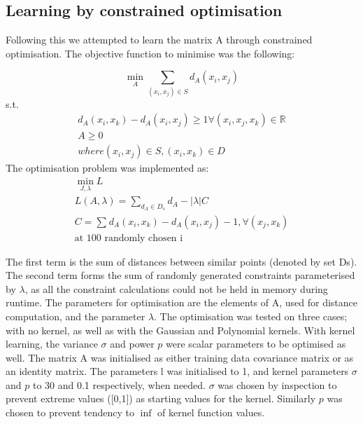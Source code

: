 \documentclass[10pt,technote]{IEEEtran}
\begin{document}
\subsection{Learning by constrained optimisation}
Following this we attempted to learn the matrix A through constrained optimisation. The objective function to minimise was the following:

\begin{equation}
    \min_{A}\sum_{(x_i, x_j) \in S}{d_A (x_i, x_j)}
\end{equation}
s.t.
\begin{equation}
    \begin{aligned}
        d_A{(x_i, x_k)} - d_A (x_i, x_j) \ge 1 \forall(x_i, x_j, x_k) \in{\mathbb{R}}  \\
        A \ge 0 \\
        where (x_i, x_j) \in S, (x_i, x_k) \in D
    \end{aligned}
\end{equation}
The optimisation problem was implemented as: 
\begin{equation}
    \begin{aligned}
    \min_{J,\lambda} L \\
    L(A, \lambda)  = \sum_{d_A \in D_s}d_A - |\lambda|C \\
        C = \sum_{}d_A{(x_i, x_k)} - d_A (x_i, x_j) -1,  \forall(x_j, x_k)  \\ \text{at 100 randomly chosen i}
    \end{aligned}
\end{equation}

The first term is the sum of distances between similar points (denoted by set Ds). The second term forms the sum of randomly generated constraints parameterised by $\lambda$, as all the constraint calculations could not be held in memory during runtime. The parameters for optimisation are the elements of A, used for distance computation, and the parameter $\lambda$. The optimisation was tested on three cases; with no kernel, as well as with the Gaussian and Polynomial kernels. With kernel learning, the variance $\sigma$ and power $p$ were scalar parameters to be optimised as well. The matrix A was initialised as either training data covariance matrix or as an identity matrix. The parameters l was initialised to 1, and kernel parameters $\sigma$ and $p$ to 30 and 0.1 respectively, when needed. $\sigma$ was chosen by inspection to prevent extreme values ([0,1]) as starting values for the kernel. Similarly $p$ was chosen to prevent tendency to $\inf$ of kernel function values.
\end{document}
